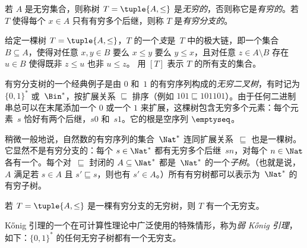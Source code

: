 \documentclass[../../../include/open-logic-section]{subfiles}
\begin{document}
\begin{defn}
若 $A$ 是无穷集合，则称树 $T = \tuple{A, \le}$ 是\emph{无穷的}，否则称它是\emph{有穷的}。若 $T$ 使得每个 $x \in A$ 只有有穷多个后继，则称 $T$ 是\emph{有穷分支的}。
\end{defn}

\begin{defn}[支]
给定一棵树 $T = \tuple{A, \le}$，$T$ 的一个\emph{支}是~$T$ 中的极大链，即一个集合 $B \subseteq A$，使得对任意 $x, y \in B$ 要么 $x \le y$ 要么 $y \le x$，且对任意 $z \in A \setminus B$ 存在 $u \in B$ 使得既非 $z \le u$ 也非 $u \le z$。
%
用 $[T]$ 表示 $T$ 的所有支的集合。
\end{defn}

\begin{ex}
有穷分支树的一个经典例子是由 $0$ 和~$1$ 的有穷序列构成的\emph{无穷二叉树}，有时记为 $\{0,1\}^*$ 或~$\Bin^*$，按扩展关系 $\sqsubseteq$ 排序（例如 $101 \sqsubseteq 101101$）。由于任何二进制串总可以在末尾添加一个 $0$ 或一个 $1$ 来扩展，这棵树包含无穷多个元素：每个元素~$s$ 恰好有两个后继，$s0$ 和~$s1$。它的根是空序列 $\emptyseq$。
\end{ex}

\begin{ex}
稍微一般地说，自然数的有穷序列的集合~$\Nat^*$ 连同扩展关系~$\sqsubseteq$ 也是一棵树。它显然不是有穷分支的：每个 $s \in \Nat^*$ 都有无穷多个后继~$sn$，对每个 $n \in \Nat$ 各有一个。每个对~$\sqsubseteq$ 封闭的 $A
\subseteq \Nat^*$ 都是~$\Nat^*$ 的一个\emph{子树}。（也就是说，$A$ 满足若 $s \in A$ 且 $s' \sqsubseteq s$，则也有 $s' \in A$。）所有有穷树都可以表示为~$\Nat^*$ 的有穷子树。
\end{ex}

\begin{prop}[K\H{o}nig 引理]
若 $T = \tuple{A,\le}$ 是一棵有穷分支的无穷树，则 $T$ 有一个无穷支。
\end{prop}

K\H{o}nig 引理的一个在可计算性理论中广泛使用的特殊情形，称为\emph{弱 K\H{o}nig 引理}，如下：$\{0,1\}^*$ 的任何无穷子树都有一个无穷支。
\end{document}
